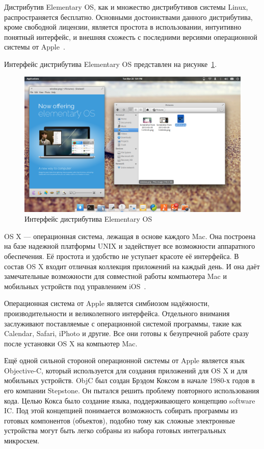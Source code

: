 Дистрибутив Elementary OS, как и множество дистрибутивов системы Linux,
распространяется бесплатно. Основными достоинствами данного дистрибутива,
кроме свободной лицензии, является простота в использовании,
интуитивно понятный интерфейс, и внешняя схожесть с последними версиями
операционной системы от Apple~\cite{elementary_os}.

Интерфейс дистрибутива Elementary OS представлен на рисунке~\ref{pic:elementary}.
\begin{figure}[h!]
  \centering
  \includegraphics[width=150mm]{pic/elementary.png}
  \caption{Интерфейс дистрибутива Elementary OS}
  \label{pic:elementary}
\end{figure}

OS X --- операционная система, лежащая в основе каждого Mac. Она построена на
базе надежной платформы UNIX и задействует все возможности аппаратного обеспечения.
Её простота и удобство не уступает красоте её интерфейса. В состав OS X входит
отличная коллекция приложений на каждый день. И она даёт замечательные возможности
для совместной работы компьютера Mac и мобильных устройств
под управлением iOS~\cite{os_x}.

Операционная система от Apple является симбиозом надёжности, производительности
и великолепного интерфейса. Отдельного внимания заслуживают поставляемые с
операционной системой программы, такие как Calendar, Safari, iPhoto и другие.
Все они готовы к безупречной работе сразу после установки OS X на компьютер Mac.

Ещё одной сильной стороной операционной системы от Apple является язык Objective-C,
который используется для создания приложений для OS X и для мобильных устройств.
ObjC был создан Брэдом Коксом в начале 1980-х годов в его компании Stepstone.
Он пытался решить проблему повторного использования кода.
Целью Кокса было создание языка, поддерживающего концепцию software IC.
Под этой концепцией понимается возможность собирать программы
из готовых компонентов (объектов), подобно тому как сложные электронные устройства
могут быть легко собраны из набора готовых интегральных микросхем.

